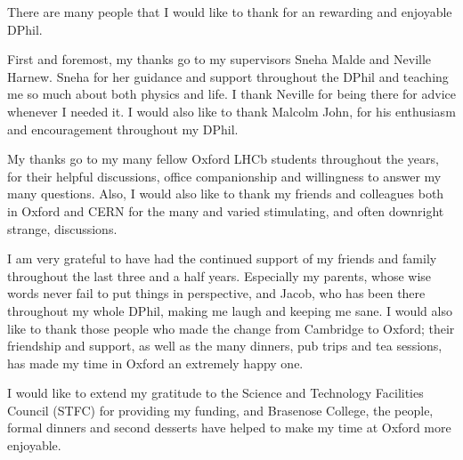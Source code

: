 
There are many people that I would like to thank for an rewarding and enjoyable DPhil.

First and foremost, my thanks go to my supervisors Sneha Malde and Neville Harnew. Sneha for her guidance and support throughout the DPhil and teaching me so much about both physics and life. I thank Neville for being there for advice whenever I needed it. I would also like to thank Malcolm John, for his enthusiasm and encouragement throughout my DPhil.

My thanks go to my many fellow Oxford LHCb students throughout the years, for their helpful discussions, office companionship and willingness to answer my many questions. Also, I would also like to thank my friends and colleagues both in Oxford and CERN for the many and varied stimulating, and often downright strange, discussions.

I am very grateful to have had the continued support of my friends and family throughout the last three and a half years. Especially my parents, whose wise words never fail to put things in perspective, and Jacob, who has been there throughout my whole DPhil, making me laugh and keeping me sane. I would also like to thank those people who made the change from Cambridge to Oxford; their friendship and support, as well as the many dinners, pub trips and tea sessions, has made my time in Oxford an extremely happy one.

I would like to extend my gratitude to the Science and Technology Facilities Council (STFC) for providing my funding, and Brasenose College, the people, formal dinners and second desserts have helped to make my time at Oxford more enjoyable.
